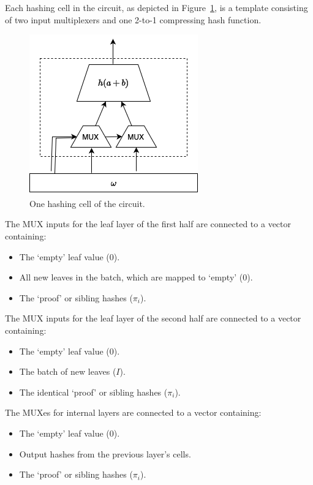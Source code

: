 \documentclass[twocolumn]{article}
\begin{document}
Each hashing cell in the circuit, as depicted in Figure~\ref{fi:smt-circuit-cell}, is a template consisting of two input multiplexers and one 2-to-1 compressing hash function.

\begin{figure}[t]
    \centering
    \includegraphics[width=.6\columnwidth]{pic/smt-circuit-cell.drawio}
    \caption{One hashing cell of the circuit.}\label{fi:smt-circuit-cell}
\end{figure}


The MUX inputs for the leaf layer of the first half are connected to a vector containing:
\begin{itemize}
    \item The `empty' leaf value ($0$).
    \item All new leaves in the batch, which are mapped to `empty' ($0$).
    \item The `proof' or sibling hashes ($\pi_i$).
\end{itemize}

The MUX inputs for the leaf layer of the second half are connected to a vector containing:
\begin{itemize}
    \item The `empty' leaf value ($0$).
    \item The batch of new leaves ($I$).
    \item The identical `proof' or sibling hashes ($\pi_i$).
\end{itemize}

The MUXes for internal layers are connected to a vector containing:
\begin{itemize}
    \item The `empty' leaf value ($0$).
    \item Output hashes from the previous layer's cells.
    \item The `proof' or sibling hashes ($\pi_i$).
\end{itemize}
\end{document}
